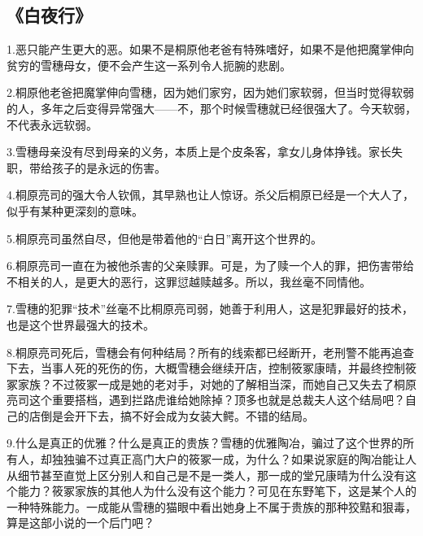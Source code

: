 \subsection{《白夜行》}
1.恶只能产生更大的恶。如果不是桐原他老爸有特殊嗜好，如果不是他把魔掌伸向贫穷的雪穗母女，便不会产生这一系列令人扼腕的悲剧。

2.桐原他老爸把魔掌伸向雪穗，因为她们家穷，因为她们家软弱，但当时觉得软弱的人，多年之后变得异常强大——不，那个时候雪穗就已经很强大了。今天软弱，不代表永远软弱。

3.雪穗母亲没有尽到母亲的义务，本质上是个皮条客，拿女儿身体挣钱。家长失职，带给孩子的是永远的伤害。

4.桐原亮司的强大令人钦佩，其早熟也让人惊讶。杀父后桐原已经是一个大人了，似乎有某种更深刻的意味。

5.桐原亮司虽然自尽，但他是带着他的“白日”离开这个世界的。

6.桐原亮司一直在为被他杀害的父亲赎罪。可是，为了赎一个人的罪，把伤害带给不相关的人，是更大的恶行，这罪愆越赎越多。所以，我丝毫不同情他。

7.雪穗的犯罪“技术”丝毫不比桐原亮司弱，她善于利用人，这是犯罪最好的技术，也是这个世界最强大的技术。

8.桐原亮司死后，雪穗会有何种结局？所有的线索都已经断开，老刑警不能再追查下去，当事人死的死伤的伤，大概雪穗会继续开店，控制筱冢康晴，并最终控制筱冢家族？不过筱冢一成是她的老对手，对她的了解相当深，而她自己又失去了桐原亮司这个重要搭档，遇到拦路虎谁给她除掉？顶多也就是总裁夫人这个结局吧？自己的店倒是会开下去，搞不好会成为女装大鳄。不错的结局。

9.什么是真正的优雅？什么是真正的贵族？雪穗的优雅陶冶，骗过了这个世界的所有人，却独独骗不过真正高门大户的筱冢一成，为什么？如果说家庭的陶冶能让人从细节甚至直觉上区分别人和自己是不是一类人，那一成的堂兄康晴为什么没有这个能力？筱冢家族的其他人为什么没有这个能力？可见在东野笔下，这是某个人的一种特殊能力。一成能从雪穗的猫眼中看出她身上不属于贵族的那种狡黠和狠毒，算是这部小说的一个后门吧？